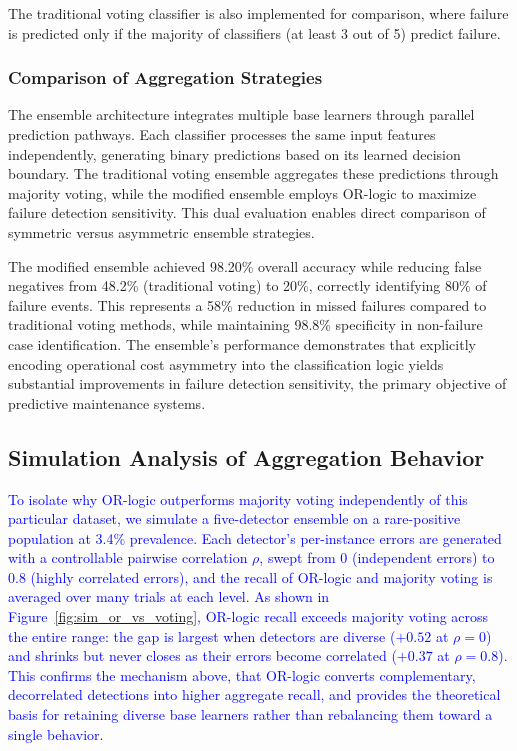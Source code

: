 \documentclass[final,5p, twocolumn]{elsarticle}
\begin{document}
The traditional voting classifier is also implemented for comparison, where failure is predicted only if the majority of classifiers (at least 3 out of 5) predict failure.

\subsubsection{Comparison of Aggregation Strategies}

The ensemble architecture integrates multiple base learners through parallel prediction pathways. Each classifier processes the same input features independently, generating binary predictions based on its learned decision boundary. The traditional voting ensemble aggregates these predictions through majority voting, while the modified ensemble employs OR-logic to maximize failure detection sensitivity. This dual evaluation enables direct comparison of symmetric versus asymmetric ensemble strategies.

The modified ensemble achieved 98.20\% overall accuracy while reducing false negatives from 48.2\% (traditional voting) to 20\%, correctly identifying 80\% of failure events. This represents a 58\% reduction in missed failures compared to traditional voting methods, while maintaining 98.8\% specificity in non-failure case identification. The ensemble's performance demonstrates that explicitly encoding operational cost asymmetry into the classification logic yields substantial improvements in failure detection sensitivity, the primary objective of predictive maintenance systems.

\subsection{Simulation Analysis of Aggregation Behavior}
\textcolor{blue}{To isolate why OR-logic outperforms majority voting independently of this particular dataset, we simulate a five-detector ensemble on a rare-positive population at 3.4\% prevalence. Each detector's per-instance errors are generated with a controllable pairwise correlation $\rho$, swept from $0$ (independent errors) to $0.8$ (highly correlated errors), and the recall of OR-logic and majority voting is averaged over many trials at each level. As shown in Figure~\ref{fig:sim_or_vs_voting}, OR-logic recall exceeds majority voting across the entire range: the gap is largest when detectors are diverse ($+0.52$ at $\rho=0$) and shrinks but never closes as their errors become correlated ($+0.37$ at $\rho=0.8$). This confirms the mechanism above, that OR-logic converts complementary, decorrelated detections into higher aggregate recall, and provides the theoretical basis for retaining diverse base learners rather than rebalancing them toward a single behavior.}
\end{document}
